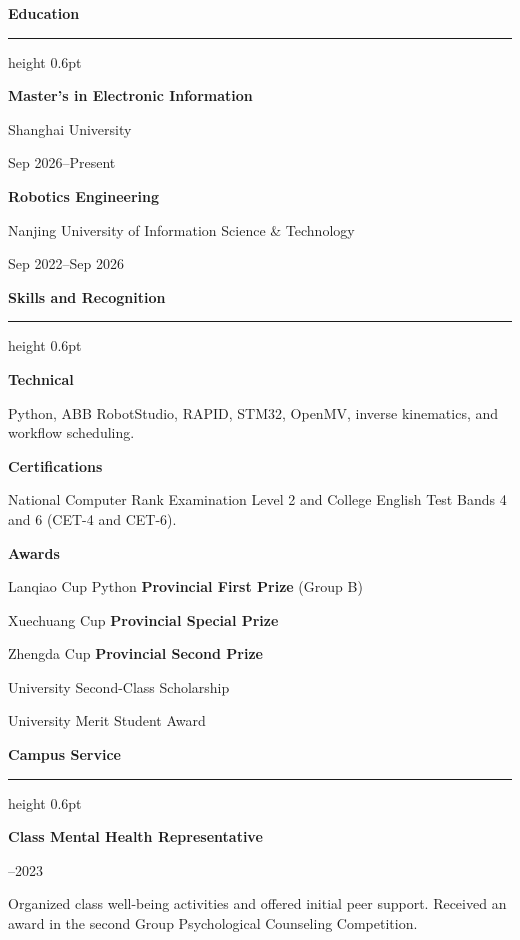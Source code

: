 \documentclass[11pt,a4paper]{article}
\newcommand{\cvsection}[1]{%
  {\color{Accent}\fontsize{14}{17}\selectfont\bfseries #1\par}%
  \vspace{4pt}%
  {\color{Rule}\hrule height 0.6pt}%
  \vspace{8pt}%
}
\newcommand{\cvdate}[1]{%
  {\color{Muted}\fontsize{9}{11}\selectfont #1}%
}
\newcommand{\detail}[2]{%
  {\color{Ink}\bfseries #1\par}%
  \vspace{2pt}%
  #2\par
  \vspace{7pt}%
}
\begin{document}
\begin{minipage}[t]{0.345\textwidth}
  \raggedright
  \vspace{0pt}
  \cvsection{Education}

  \detail{Master's in Electronic Information}{%
    Shanghai University\par
    \cvdate{Sep 2026--Present}}

  \detail{Robotics Engineering}{%
    Nanjing University of Information Science \& Technology\par
    \cvdate{Sep 2022--Sep 2026}}

  \vspace{7pt}
  \cvsection{Skills and Recognition}

  \detail{Technical}{Python, ABB RobotStudio, RAPID, STM32, OpenMV, inverse kinematics, and workflow scheduling.}

  \detail{Certifications}{National Computer Rank Examination Level 2 and College English Test Bands 4 and 6 (CET-4 and CET-6).}

  \detail{Awards}{%
    Lanqiao Cup Python \textbf{Provincial First Prize} (Group B)\par
    Xuechuang Cup \textbf{Provincial Special Prize}\par
    Zhengda Cup \textbf{Provincial Second Prize}\par
    University Second-Class Scholarship\par
    University Merit Student Award}

  \vspace{7pt}
  \cvsection{Campus Service}

  \detail{Class Mental Health Representative}{%
    \cvdate{2022--2023}\par
    \vspace{2pt}
    Organized class well-being activities and offered initial peer support. Received an award in the second Group Psychological Counseling Competition.}
\end{minipage}\par
\end{document}
